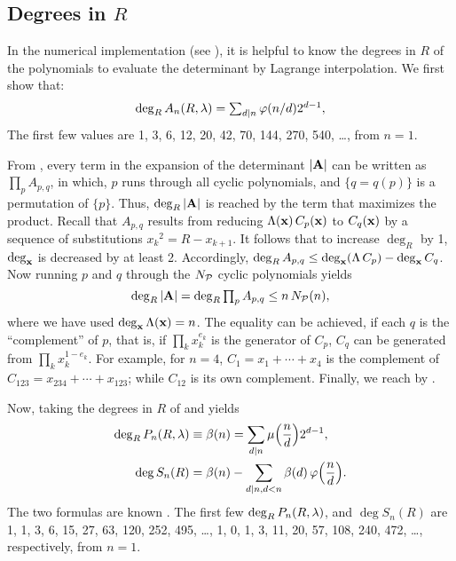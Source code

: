 \documentclass{ws-ijbc}
\begin{document}
\subsection{\label{sec:degR}Degrees in $R$}



In the numerical implementation
  (see ),
  it is helpful to know the degrees in $R$ of the polynomials
  to evaluate the determinant by Lagrange interpolation. 
We first show that:
\begin{equation}
\deg_R A_n(R, \lambda) = \textstyle\sum_{d|n} \varphi(n/d) 2^{d-1},
\label{eq:degRA}
\end{equation}
%
The first few values are
1, 3, 6, 12, 20, 42, 70, 144, 270, 540, \dots, from $n =1$.%

From ,
  every term in the expansion of the determinant $|\mathbf{A}|$
  can be written as
  $\prod_{p} A_{p,q}$,
  in which, $p$ runs through all cyclic polynomials,
  and $\{q = q(p)\}$ is a permutation of $\{p\}$.
Thus, $\deg_R |\mathbf{A}|$ is
  reached by the term that maximizes the product.
Recall that $A_{p,q}$ results from reducing
  $\Lambda(\mathbf{x}) \, C_p(\mathbf{x})$ to $C_q(\mathbf{x})$
  by a sequence of substitutions ${x_k}^2 = R-x_{k+1}$.
It follows that to increase $\deg_R$ by 1,
  $\deg_{\mathbf{x}}$ is decreased by at least 2.
Accordingly,
  $\deg_R A_{p,q} \le \deg_{\mathbf{x}}(\Lambda \, C_p) - \deg_{\mathbf{x}} C_q$.
Now running $p$ and $q$ through the $N_\mathcal P$ cyclic polynomials
  yields
\[
  \deg_R |\mathbf{A} | = \deg_R \textstyle\prod_{p} A_{p,q} \le n \, N_\mathcal P(n),
\]
where we have used $\deg_{\mathbf{x}} \Lambda(\mathbf{x}) = n$.
%
The equality can be achieved, if each $q$ is the ``complement'' of $p$,
  that is, if $\prod_k x_k^{e_k}$ is the generator of $C_p$,
  $C_q$ can be generated from $\prod_k x_k^{1-e_k}$.
For example, for $n=4$,
  $C_1 = x_1 + \cdots + x_4$
  is the complement of
  $C_{123} = x_{234} + \cdots + x_{123}$;
  while $C_{12}$ is its own complement.
Finally, we reach  by .


Now, taking the degrees in $R$ of  and 
  yields
%
\begin{subequations}
\begin{align}
\deg_R P_n(R, \lambda) &\equiv \beta(n) = \sum_{d|n} \mu\Big(\frac{n}{d}\Big) 2^{d-1}, \\
    \deg S_n(R) &= \beta(n)
  - \sum_{d | n, d < n} \beta(d) \, \varphi\Big(\frac{n}{d}\Big).
\end{align}
\label{eq:degR}
\end{subequations}
%
The two formulas are known \cite{mira, stephenson1, blackhurst}.
%
%
The first few
  $\deg_R P_n(R, \lambda)$,
  and $\deg S_n(R)$ are
  1, 1, 3, 6, 15, 27, 63, 120, 252, 495, \dots, %
  1, 0, 1, 3, 11, 20, 57, 108, 240, 472, \dots, %
  respectively, from $n = 1$.
\end{document}

